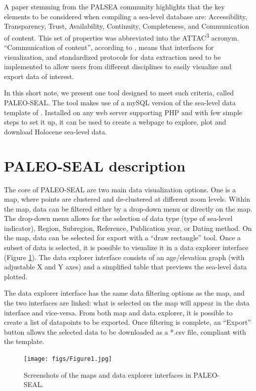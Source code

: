 \documentclass[a4paper,fleqn]{cas-dc}
\begin{document}
A paper stemming from the PALSEA community \citep{dusterhus2016} highlights that the key elements to be considered when compiling a sea-level database are: Accessibility, Transparency, Trust, Availability, Continuity, Completeness, and Communication of content. This set of properties was abbreviated into the ATTAC\textsuperscript{3} acronym. ``Communication of content'',  according to \citet{dusterhus2016}, means that interfaces for visualization, and standardized protocols for data extraction need to be implemented to allow users from different disciplines to easily visualize and export data of interest. 

In this short note, we present one tool designed to meet such criteria, called PALEO-SEAL. The tool makes use of a mySQL version of the sea-level data template of \citet{khan2019}. Installed on any web server supporting PHP and with few simple steps to set it up, it can be used to create a webpage to explore, plot and download Holocene sea-level data. 

\section{PALEO-SEAL description}
The core of PALEO-SEAL are two main data visualization options. One is a map, where points are clustered and de-clustered at different zoom levels. Within the map, data can be filtered either by a drop-down menu or directly on the map. The drop-down menu allows for the selection of data type (type of sea-level indicator), Region, Subregion, Reference, Publication year, or Dating method. On the map, data can be selected for export with a ``draw rectangle'' tool. Once a subset of data is selected, it is possible to visualize it in a data explorer interface (Figure \ref{fig:1}). The data explorer interface consists of an age/elevation graph (with adjustable X and Y axes) and a simplified table that previews the sea-level data plotted. 

The data explorer interface has the same data filtering options as the map, and the two interfaces are linked: what is selected on the map will appear in the data interface and vice-versa. From both map and data explorer, it is possible to create a list of datapoints to be exported. Once filtering is complete, an ``Export'' button allows the selected data to be downloaded as a *.csv file, compliant with the \citet{khan2019} template.

\begin{figure}
	\centering
	\texttt{[image: figs/Figure1.jpg]}
	\caption{Screenshots of the maps and data explorer interfaces in PALEO-SEAL.}
	\label{fig:1}
\end{figure}
\end{document}
